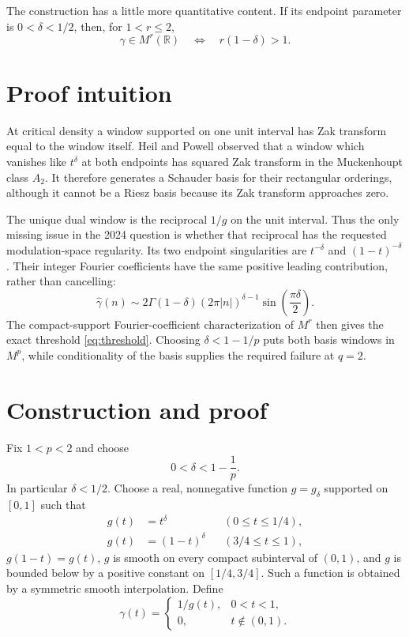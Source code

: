 \documentclass[11pt]{article}
\newcommand{\R}{\mathbb R}
\begin{document}
The construction has a little more quantitative content.  If its endpoint
parameter is $0<\delta<1/2$, then, for $1<r\leq2$,
\begin{equation}\label{eq:threshold}
 \gamma\in M^r(\R)
 \quad\Longleftrightarrow\quad r(1-\delta)>1.
\end{equation}

\section{Proof intuition}

At critical density a window supported on one unit interval has Zak
transform equal to the window itself.  Heil and Powell observed that a
window which vanishes like $t^\delta$ at both endpoints has squared Zak
transform in the Muckenhoupt class $A_2$.  It therefore generates a Schauder
basis for their rectangular orderings, although it cannot be a Riesz basis
because its Zak transform approaches zero.

The unique dual window is the reciprocal $1/g$ on the unit interval.  Thus
the only missing issue in the 2024 question is whether that reciprocal has
the requested modulation-space regularity.  Its two endpoint singularities
are $t^{-\delta}$ and $(1-t)^{-\delta}$.  Their integer Fourier coefficients
have the same positive leading contribution, rather than cancelling:
\[
 \widehat\gamma(n)
 \sim 2\Gamma(1-\delta)(2\pi |n|)^{\delta-1}
       \sin\!\left(\frac{\pi\delta}{2}\right).
\]
The compact-support Fourier-coefficient characterization of $M^r$ then gives
the exact threshold \eqref{eq:threshold}.  Choosing
$\delta<1-1/p$ puts both basis windows in $M^p$, while conditionality of the
basis supplies the required failure at $q=2$.

\section{Construction and proof}

Fix $1<p<2$ and choose
\begin{equation}\label{eq:deltachoice}
 0<\delta<1-\frac1p.
\end{equation}
In particular $\delta<1/2$.  Choose a real, nonnegative function $g=g_\delta$
supported on $[0,1]$ such that
\begin{align*}
 g(t)&=t^\delta &&(0\leq t\leq1/4),\\
 g(t)&=(1-t)^\delta &&(3/4\leq t\leq1),
\end{align*}
$g(1-t)=g(t)$, $g$ is smooth on every compact subinterval of $(0,1)$,
and $g$ is bounded below by a positive constant on $[1/4,3/4]$.
Such a function is obtained by a symmetric smooth interpolation.  Define
\begin{equation}\label{eq:dual}
 \gamma(t)=
 \begin{cases}
  1/g(t),&0<t<1,\\
  0,&t\notin(0,1).
 \end{cases}
\end{equation}
\end{document}
